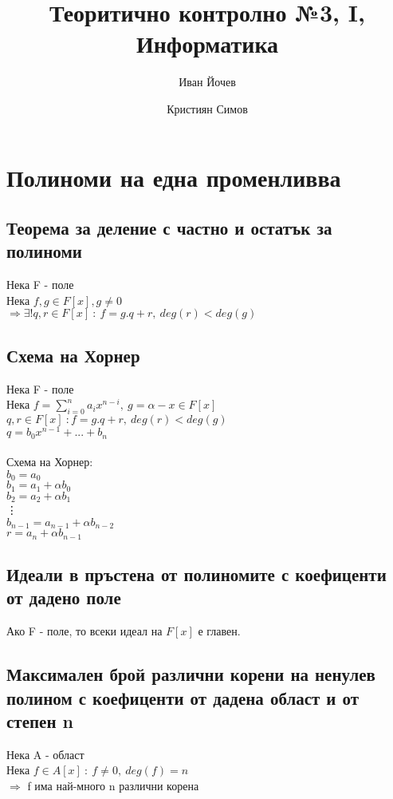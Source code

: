 \documentclass[12pt]{article}
\title{Теоритично контролно №3, I, Информатика}
\author{Иван Йочев \and Кристиян Симов}
\begin{document}
\maketitle

\section{Полиноми на една променливва}

\subsection{Теорема за деление с частно и остатък за полиноми}

Нека F - поле\\
Нека $f,g \in F[x], g \neq 0$ \\
$\Rightarrow \exists! q,r \in F[x]\ :\ f=g.q + r,\ deg(r) < deg(g)$\\

\subsection{Схема на Хорнер}

Нека F - поле \\
Нека $f = \sum\limits_{i=0}^{n} a_ix^{n-i},\ g = \alpha - x \in F[x]$\\
$  q,r \in F[x]\ : f=g.q + r ,\ deg(r) < deg(g)$ \\
$q = b_0x^{n-1}+...+b_n$\\\\
Схема на Хорнер: \\
$b_0 = a_0$ \\
$b_1 = a_1 + \alpha b_0$ \\
$b_2 = a_2 + \alpha b_1$ \\
\vdots \\
$b_{n-1} = a_{n-1} + \alpha b_{n-2}$\\
$r = a_n + \alpha b_{n-1}$

\subsection{Идеали в пръстена от полиномите с коефиценти от дадено поле}
Ако F - поле, то всеки идеал на $F[x]$ е главен.

\subsection{Максимален брой различни корени на ненулев полином с коефиценти от дадена област и от степен n}
Нека A - област \\
Нека $f \in A[x]\ :\ f \neq 0,\ deg(f) = n$ \\
$\Rightarrow$ f има най-много n различни корена
\end{document}
